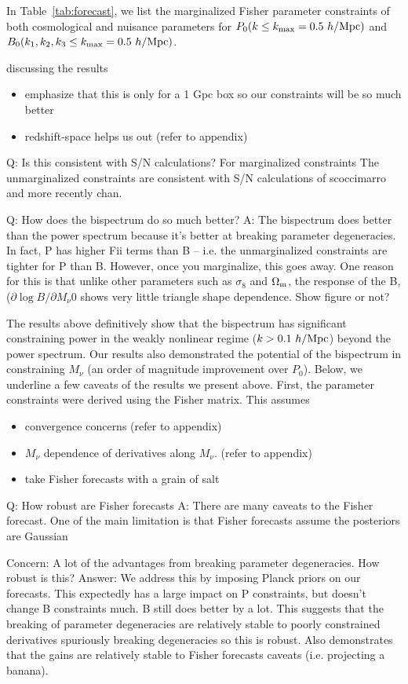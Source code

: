 \documentclass[12pt, letterpaper, preprint]{aastex62}
\newcommand{\Om}{\Omega_{\rm m}}
\newcommand{\smnu}{M_\nu}
\newcommand{\sig}{\sigma_8}
\newcommand{\bitem}{\begin{itemize}}
\newcommand{\eitem}{\end{itemize}}
\begin{document}
In Table~\ref{tab:forecast}, we list the marginalized Fisher parameter 
constraints of both cosmological and nuisance parameters for 
$P_0(k \le k_{\rm max}=0.5~h/{\rm Mpc})$ and $B_0(k_1, k_2, k_3 \le k_{\rm max}=0.5~h/{\rm Mpc})$.

discussing the results  
\bitem 
\item emphasize that this is only for a 1 Gpc box so our constraints will be so much better
\item redshift-space helps us out (refer to appendix) 
\eitem 
Q: Is this consistent with S/N calculations? 
For marginalized constraints 
The unmarginalized constraints are consistent with S/N calculations of scoccimarro and 
more recently chan. 

Q: How does the bispectrum do so much better? 
A: The bispectrum does better than the power spectrum because it's better at breaking
parameter degeneracies. In fact, P has higher Fii terms than B -- i.e. the unmarginalized
constraints are tighter for P than B. However, once you marginalize, this goes away. One
reason for this is that unlike other parameters such as $\sig$ and $\Om$, the response of
the B, ($\partial \log B / \partial \smnu$0 shows very little triangle shape dependence.  
Show figure or not? 


The results above definitively show that the bispectrum has significant 
constraining power in the weakly nonlinear regime ($k > 0.1~h/{\rm Mpc}$) 
beyond the power spectrum. Our results also demonstrated the potential of 
the bispectrum in constraining $\smnu$ (an order of magnitude improvement over 
$P_0$). Below, we underline a few caveats of the results we present above. 
First, the parameter constraints were derived using the Fisher matrix. This 
assumes 
\bitem
\item convergence concerns (refer to appendix) 
\item $\smnu$ dependence of derivatives along $\smnu$. (refer to appendix) 
\item take Fisher forecasts with a grain of salt 
\eitem 

Q: How robust are Fisher forecasts
A: There are many caveats to the Fisher forecast. One of the main limitation is that 
Fisher forecasts assume the posteriors are Gaussian

Concern: A lot of the advantages from breaking parameter degeneracies. How robust is this? 
Answer: We address this by imposing Planck priors on our forecasts. This expectedly has a 
large impact on P constraints, but doesn't change B constraints much. B still does better 
by a lot. This suggests that the breaking of parameter degeneracies are relatively stable 
to poorly constrained derivatives spuriously breaking degeneracies so this is robust. Also 
demonstrates that the gains are relatively stable to Fisher forecasts caveats 
(i.e. projecting a banana). 
\end{document}
